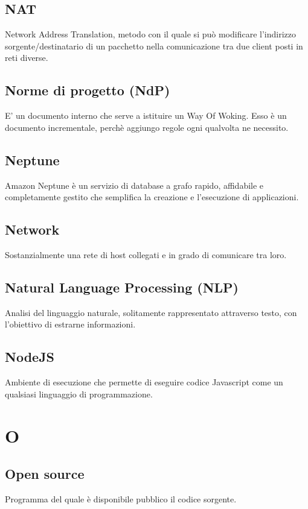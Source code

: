 \documentclass{classes/base}
\begin{document}
        \subsection*{NAT}
        Network Address Translation, metodo con il quale si può modificare l'indirizzo sorgente/destinatario di un pacchetto nella comunicazione tra due client posti in reti diverse.

        \subsection*{Norme di progetto (NdP)} 
        E' un documento interno che serve a istituire un Way Of Woking. Esso è un documento incrementale, perchè aggiungo regole ogni qualvolta ne necessito.
        
        \subsection*{Neptune}
        Amazon Neptune è un servizio di database a grafo rapido, affidabile e completamente gestito che semplifica la creazione e l'esecuzione di applicazioni.

        \subsection*{Network}
        Sostanzialmente una rete di host collegati e in grado di comunicare tra loro.

        \subsection*{Natural Language Processing (NLP)}
        Analisi del linguaggio naturale, solitamente rappresentato attraverso testo, con l'obiettivo di estrarne informazioni.

        \subsection*{NodeJS}
        Ambiente di esecuzione che permette di eseguire codice Javascript come un qualsiasi linguaggio di programmazione.
        \newpage  
    \section{O}
        \subsection*{Open source}
        Programma del quale è disponibile pubblico il codice sorgente.
        \newpage  
\end{document}

